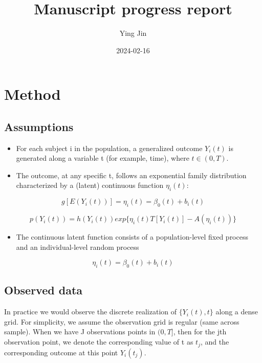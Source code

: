 \documentclass[
]{article}
\title{Manuscript progress report}
\author{Ying Jin}
\date{2024-02-16}
\providecommand{\tightlist}{%
  \setlength{\itemsep}{0pt}\setlength{\parskip}{0pt}}
\begin{document}
\maketitle

{
\setcounter{tocdepth}{3}
\tableofcontents
}
\hypertarget{method}{%
\section{Method}\label{method}}

\hypertarget{assumptions}{%
\subsection{Assumptions}\label{assumptions}}

\begin{itemize}
\tightlist
\item
  For each subject i in the population, a generalized outcome \(Y_i(t)\)
  is generated along a variable t (for example, time), where
  \(t \in (0, T)\).
\item
  The outcome, at any specific t, follows an exponential family
  distribution characterized by a (latent) continuous function
  \(\eta_i(t)\):
\end{itemize}

\[g[E(Y_i(t))] = \eta_i(t) = \beta_0(t)+b_i(t)\]

\[p(Y_i(t)) = h(Y_i(t))exp\{\eta_i(t)T[Y_i(t)]-A(\eta_i(t))\}\]

\begin{itemize}
\tightlist
\item
  The continuous latent function consists of a population-level fixed
  process and an individual-level random process
\end{itemize}

\[\eta_i(t) = \beta_0(t)+b_i(t)\]

\hypertarget{observed-data}{%
\subsection{Observed data}\label{observed-data}}

In practice we would observe the discrete realization of
\(\{Y_i(t), t\}\) along a dense grid. For simplicity, we assume the
observation grid is regular (same across sample). When we have J
observations points in \((0, T]\), then for the jth observation point,
we denote the corresponding value of t as \(t_j\), and the corresponding
outcome at this point \(Y_i(t_j)\).
\end{document}
